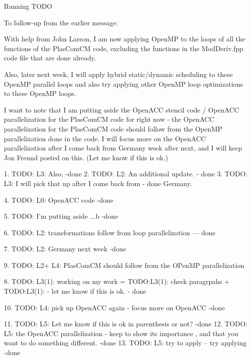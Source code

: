 \documentclass[serif, mathserif, final]{beamer}
\begin{document}
\begin{frame}
\begin{columns}
\begin{column}{0.50\linewidth}
\begin{block}{Running TODO}
\begin{enumerate}
{        To follow-up from the earlier message: 
        
        With help from John Larson, I am now applying OpenMP to the loops of all the functions of the 
        PlasComCM code, excluding the functions in the ModDeriv.fpp
        code file that are done already. 

        Also, later next week, I will apply hybrid static/dynamic scheduling to
        these OpenMP parallel loops and also try applying other OpenMP loop
        optimizations to these OpenMP loops. 

        I want to note that I am putting aside the OpenACC stencil code
        / OpenACC parallelization for the PlasComCM code for right
        now - the OpenACC parallelization for the PlasComCM code should
        follow from the OpenMP parallelization done in the code. 
        I will focus more on the OpenACC parallelization after I come back from Germany
        week after next, and I will keep Jon Freund posted on this. (Let
        me know if this is ok.) 


        1. TODO: L3: Also, -done 
        2. TODO: L2: An additional update.  - done 
        3. TODO: L3: I will pick that up after I come back from - done 
        Germany. 
        
        4. TODO: L0: OpenACC code  -done 
        
        5. TODO: I'm putting aside ...b -done 

        6. TODO: L2: transformations follow from loop parallelization
        --- done

        7. TODO: L2: Germany next week  -done

        9. TODO: L2+ L4: PlasComCM should follow from the OPenMP
        parallelization 
        
        8. TODO: L3(1): working on my work = TODO:L3(1): check
        paragrpahs + TODO:L3(1): - let me know
        if this is ok. - done 

        10. TODO: L4: pick up OpenACC again - focus more on OpenACC
        -done  

        11. TODO: L5: Let me know if this is ok in parenthesis or not?
        -done 
        12. TODO: L5: the OpenACC parallelization - keep to show its
        importance , and that you want to do something
        different. -done 
        13. TODO: L5: try to apply --   try applying -done 

}
\end{enumerate}
\end{block}
\end{column}
\end{columns}
\end{frame}
\end{document}

